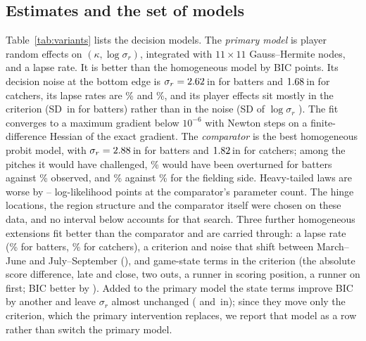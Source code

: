 \documentclass[aoas]{imsart}
\theoremstyle{plain}
\theoremstyle{definition}
\begin{document}
\subsection{Estimates and the set of models}\label{sec:estimates}
Table~\ref{tab:variants} lists the decision models. The \emph{primary model} is player random effects on $(\kappa,\log\sigma_r)$, integrated with $11\times11$ Gauss--Hermite
nodes, and a lapse rate. It is better than the homogeneous model by \PDBIC{} BIC points. Its decision noise at the
bottom edge is $\sigma_r=2.62$\,in for batters and $1.68$\,in for catchers, its lapse rates are
\PLapseBatter\% and \PLapseCatcher\%, and its player effects sit mostly in the criterion (SD \REKappaSDBatter\,in for
batters) rather than in the noise (SD of $\log\sigma_r$ \RELogSrSDBatter). The fit converges to a maximum gradient below
$10^{-6}$ with Newton steps on a finite-difference Hessian of the exact gradient. The \emph{comparator} is the best
homogeneous probit model, with $\sigma_r=2.88$\,in for batters and $1.82$\,in for catchers; among the
pitches it would have challenged, \OverBatterPred\% would have been overturned for batters against \OverBatterObs\%
observed, and \OverCatcherPred\% against \OverCatcherObs\% for the fielding side. Heavy-tailed laws are worse by \DLLRejMainLo--\DLLRejMainHi{} log-likelihood points at the comparator's parameter
count. The hinge locations, the region structure and the comparator itself were chosen on these data, and no interval
below accounts for that search. Three further homogeneous extensions fit better than the comparator and are carried
through: a lapse rate (\LapseBatter\% for batters, \LapseCatcher\% for
catchers), a criterion and noise that shift between March--June and July--September (\TimeDBICtxt), and game-state
terms in the criterion (the absolute score difference, late and close, two outs, a runner in scoring position, a runner
on first; BIC better by \StateDBIC). Added to the primary model the state terms improve BIC by another \REStateDBIC{}
and leave $\sigma_r$ almost unchanged (\REStateSrBatter{} and \REStateSrCatcher\,in); since they move only the
criterion, which the primary intervention replaces, we report that model as a row rather than switch the primary model.
\end{document}
